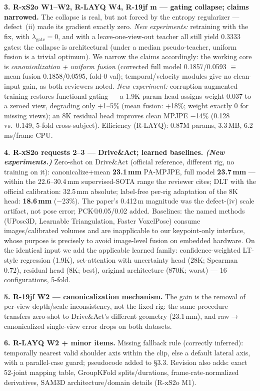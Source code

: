 \documentclass[10pt,a4paper]{article}
\newcommand{\head}[1]{\vspace{2pt}\textbf{#1}\;}
\begin{document}
\head{3. R-xS2o W1--W2, R-LAYQ W4, R-19jf m --- gating collapse; claims narrowed.}
The collapse is real, but not forced by the entropy regularizer --- defect~(ii) made its gradient exactly zero. \emph{New experiments:} retraining with the fix, with $\lambda_{\mathrm{gate}}{=}0$, and with a leave-one-view-out teacher all still yield 0.3333 gates: the collapse is architectural (under a median pseudo-teacher, uniform fusion is a trivial optimum). We narrow the claims accordingly: the working core is \emph{canonicalization + uniform fusion} (corrected full model 0.1857/0.0593 $\equiv$ mean fusion 0.1858/0.0595, fold-0 val); temporal/velocity modules give no clean-input gain, as both reviewers noted. \emph{New experiment:} corruption-augmented training restores functional gating --- a 1.9K-param head assigns weight 0.037 to a zeroed view, degrading only +1--5\% (mean fusion: +18\%; weight exactly 0 for missing views); an 8K residual head improves clean MPJPE $-$14\% (0.128 vs.\ 0.149, 5-fold cross-subject). Efficiency (R-LAYQ): 0.87M params, 3.3\,MB, 6.2\,ms/frame CPU.

\head{4. R-xS2o requests 2--3 --- Drive\&Act; learned baselines. \emph{(New experiments.)}}
Zero-shot on Drive\&Act (official reference, different rig, no training on it): canonicalize+mean \textbf{23.1\,mm} PA-MPJPE, full model \textbf{23.7\,mm} --- within the 22.6--30.4\,mm supervised-SOTA range the reviewer cites; DLT with the official calibration: 32.5\,mm absolute; label-free per-rig adaptation of the 8K head: \textbf{18.6\,mm} ($-$23\%). The paper's 0.412\,m magnitude was the defect-(iv) scale artifact, not pose error; PCK@0.05/0.02 added. Baselines: the named methods (UPose3D, Learnable Triangulation, Faster VoxelPose) consume images/calibrated volumes and are inapplicable to our keypoint-only interface, whose purpose is precisely to avoid image-level fusion on embedded hardware. On the identical input we add the applicable learned family: confidence-weighted LT-style regression (1.9K), set-attention with uncertainty head (28K; Spearman 0.72), residual head (8K; best), original architecture (870K; worst) --- 16 configurations, 5-fold.

\head{5. R-19jf W2 --- canonicalization mechanism.}
The gain is the removal of per-view depth/scale inconsistency, not the fixed rig: the same procedure transfers zero-shot to Drive\&Act's different geometry (23.1\,mm), and raw$\to$canonicalized single-view error drops on both datasets.

\head{6. R-LAYQ W2 + minor items.}
Missing fallback rule (correctly inferred): temporally nearest valid shoulder axis within the clip, else a default lateral axis, with a parallel-case guard; pseudocode added to \S3.3. Revision also adds: exact 52-joint mapping table, GroupKFold splits/durations, frame-rate-normalized derivatives, SAM3D architecture/domain details (R-xS2o M1).
\end{document}
